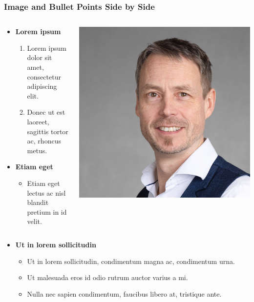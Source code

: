 \documentclass[english,hangout]{beamer}
\begin{document}
\begin{frame}
\frametitle{Image and Bullet Points Side by Side}
\begin{columns}[onlytextwidth]
\begin{column}{.7\textwidth}
\begin{itemize}
\item \textbf{Lorem ipsum} 
\begin{enumerate}
\item Lorem ipsum dolor sit amet, consectetur adipiscing elit.
\item Donec ut est laoreet, sagittis tortor ac, rhoncus metus.
\end{enumerate}
\item \textbf{Etiam eget} 
\begin{itemize}
\item Etiam eget lectus ac nisl blandit pretium in id velit.
\end{itemize}
\end{itemize}
\end{column}

\begin{column}{.3\textwidth}
\includegraphics[width=\textwidth]{me}
\end{column}
\end{columns}

\vspace{-.7mm}
\begin{itemize}
\item \textbf{Ut in lorem sollicitudin}
\begin{itemize}
\item Ut in lorem sollicitudin, condimentum magna ac, condimentum urna.
\item Ut malesuada eros id odio rutrum auctor varius a mi.
\item Nulla nec sapien condimentum, faucibus libero at, tristique ante.
\end{itemize}
\end{itemize}
\end{frame}
\end{document}
